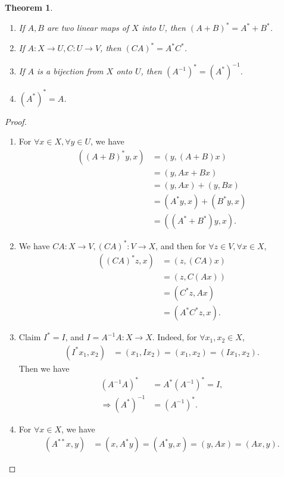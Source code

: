 \documentclass[10pt]{book}
\newtheorem{theorem}{Theorem}[chapter]
\theoremstyle{definition}
\numberwithin{equation}{chapter}
\begin{document}
\begin{theorem}\label{transpose_linear_map_theorem}
~\begin{enumerate}[label=(\alph*)]
    \item If $A,B$ are two linear maps of $X$ into $U$, then $(A+B)^* = A^* + B^*$.
    \item If $A:X\to U, C:U\to V$, then $(CA)^* = A^* C^*$.
    \item If $A$ is a bijection from $X$ onto $U$, then $\left(A^{-1}\right)^* = \left(A^*\right)^{-1}$.
    \item $\left(A^*\right)^* = A$.
\end{enumerate}
\end{theorem}
\begin{proof}
~\begin{enumerate}[label=(\alph*)]
    \item For $\forall x\in X, \forall y\in U$, we have
    \begin{align*}
        \left((A+B)^*y, x\right) & = (y, (A+B)x) \\
        & = (y, Ax + Bx) \\
        & = (y, Ax) + (y, Bx) \\
        & = (A^*y, x) + (B^*y, x) \\
        & = ((A^* + B^*)y, x).
    \end{align*}
    \item We have $CA:X\to V, (CA)^*:V\to X$, and then for $\forall z\in V, \forall x\in X$,
    \begin{align*}
        \left((CA)^*z, x\right) & = (z, (CA)x) \\
        & = (z, C(Ax)) \\
        & = (C^* z, Ax) \\
        & = (A^* C^* z, x).
    \end{align*}
    \item Claim $I^* = I$, and $I = A^{-1}A: X\to X$. Indeed,  for $\forall x_1, x_2\in X$,
    \begin{align*}
        (I^* x_1, x_2) & = (x_1, Ix_2) = (x_1, x_2) = (Ix_1, x_2).
    \end{align*}
    Then we have 
    \begin{align*}
        \left(A^{-1}A\right)^* & = A^* \left(A^{-1}\right)^* = I, \\
        \Rightarrow \left(A^*\right)^{-1} & = \left(A^{-1}\right)^*. 
    \end{align*}
    \item For $\forall x\in X$, we have
    \begin{align*}
        \left(A^{**}x, y\right) & = (x, A^*y) = (A^*y, x) = (y, Ax) = (Ax, y).
    \end{align*}
\end{enumerate}
\end{proof}
\end{document}
